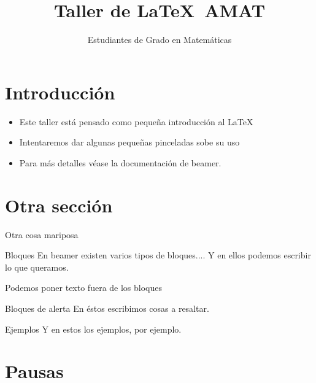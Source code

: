 \documentclass{beamer}
\title[Taller de \LaTeX]{Taller de \LaTeX\ AMAT}
\author[Los presentes]{Estudiantes de Grado en Matemáticas}
\institute[UGR]{Universidad de Granada}
\begin{document}
\maketitle


\section*{Introducción}

\begin{frame}
\begin{itemize}[<+-|alert@+>]
\item Este taller está pensado como pequeña introducción al \LaTeX 

\item Intentaremos dar algunas pequeñas pinceladas sobe su uso 

\item Para m\'as detalles véase la documentación de beamer.
\end{itemize}
\end{frame}

\section{Otra sección}

\begin{frame}{Otra cosa mariposa}
\begin{block}{Bloques}
En beamer existen varios tipos de bloques....
Y en ellos podemos escribir lo que queramos.
\end{block}

Podemos poner texto fuera de los bloques

\begin{alertblock}{Bloques de alerta}
En éstos escribimos cosas a resaltar.
\end{alertblock}

\begin{exampleblock}{Ejemplos}
Y en estos los ejemplos, por ejemplo.
\end{exampleblock}

\end{frame}

\section{Pausas}
\end{document}
